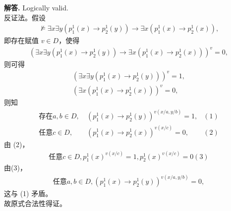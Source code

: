 \documentclass[12pt, a4paper, oneside]{ctexart}
\newenvironment{solution}{\par\noindent\textbf{解答. }}{\par}
\begin{document}
\begin{solution}
    Logically valid.\\
    反证法。假设
    \begin{align*}
        \not\vDash\exists x\exists y
        (p_1^1(x)\rightarrow p_2^1(y))
        \rightarrow
        \exists x(p_1^1(x)\rightarrow p_2^1(x)),
    \end{align*}
    即存在赋值 $v\in D$，使得
    \begin{align*}
        (\exists x\exists y
        (p_1^1(x)\rightarrow p_2^1(y))
        \rightarrow
        \exists x(p_1^1(x)\rightarrow p_2^1(x)))^v=0,
    \end{align*}
    则可得
    \begin{align*}
        (\exists x\exists y
        (p_1^1(x)\rightarrow p_2^1(y)))^v=1,\\
        (\exists x(p_1^1(x)\rightarrow p_2^1(x)))^v=0,
    \end{align*}
    则知
    \begin{align*}
        \text{存在}a,b\in D, \ 
         &(p_1^1(x)\rightarrow p_2^1(y))^{v(x/a,y/b)}=1,&(1)\\
        \text{任意}c\in D,\ 
        &(p_1^1(x)\rightarrow p_2^1(x))^{v(x/c)}=0,&(2)
    \end{align*}
    由 (2)，
    \begin{align*}
        \text{任意}c\in D,
        p_1^1(x)^{v(x/c)}=1,p_2^1(x)^{v(x/c)}=0 (3)
    \end{align*}
    由(3)，
    \begin{align*}
        \text{任意}a,b\in D,
        (p_1^1(x)\rightarrow p_2^1(y))^{v(x/a, y/b)}=0,
    \end{align*}
    这与 (1) 矛盾。\\
    故原式合法性得证。
\end{solution}
\end{document}

